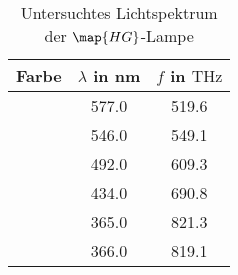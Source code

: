 \begin{table}
\centering
\caption{Untersuchtes Lichtspektrum der $\map{HG}$-Lampe }
\label{tab: wellen}
\begin{tabular}{S S S }
\toprule
{Farbe} & {$\lambda$ in \si{\nano\meter}} & { $f$ in $\si{\THz}$ } \\
\midrule
{} & 577.0  & 519.6\\
 & 546.0  & 549.1\\
 & 492.0  & 609.3\\
  & 434.0  & 690.8\\
  & 365.0  & 821.3\\
 & 366.0  & 819.1\\
\bottomrule
\end{tabular}
\end{table}
